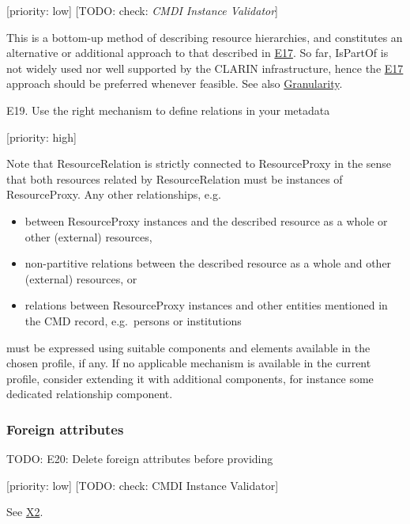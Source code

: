\documentclass[]{article}
\providecommand{\tightlist}{%
  \setlength{\itemsep}{0pt}\setlength{\parskip}{0pt}}
\begin{document}
{[}priority: low{]} {[}TODO: check: \emph{CMDI Instance Validator}{]}

This is a bottom-up method of describing resource hierarchies, and
constitutes an alternative or additional approach to that described in
\protect\hyperlink{e17-use-resourceproxy-to-express-partitive-relationships-between-the-described-resource-as-a-whole-and-its-constituent-resources}{E17}.
So far, IsPartOf is not widely used nor well supported by the CLARIN
infrastructure, hence the
\protect\hyperlink{e17-use-resourceproxy-to-express-partitive-relationships-between-the-described-resource-as-a-whole-and-its-constituent-resources}{E17}
approach should be preferred whenever feasible. See also
\href{/common_approachesproblems/granularity.md}{Granularity}.

E19. Use the right mechanism to define relations in your metadata

{[}priority: high{]}

Note that ResourceRelation is strictly connected to ResourceProxy in the
sense that both resources related by ResourceRelation must be instances
of ResourceProxy. Any other relationships, e.g.

\begin{itemize}
\tightlist
\item
  between ResourceProxy instances and the described resource as a whole
  or other (external) resources,
\item
  non-partitive relations between the described resource as a whole and
  other (external) resources, or
\item
  relations between ResourceProxy instances and other entities mentioned
  in the CMD record, e.g.~persons or institutions
\end{itemize}

must be expressed using suitable components and elements available in
the chosen profile, if any. If no applicable mechanism is available in
the current profile, consider extending it with additional components,
for instance some dedicated relationship component.

\subsubsection{Foreign attributes}\label{foreign-attributes}

TODO: E20: Delete foreign attributes before providing

{[}priority: low{]} {[}TODO: check: CMDI Instance Validator{]}

See \href{/authoring_component_metadata_records/general_xml.md\#x2}{X2}.
\end{document}
